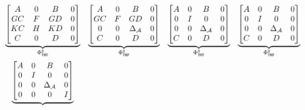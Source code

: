     \begin{equation}
        \label{eq:cont-skip} 
            \begin{matrix}
                \underbrace{\begin{bmatrix}
                    A  & 0 & B & 0 \\
                    GC & F & GD & 0 \\
                    KC & H & KD & 0 \\
                    C & 0 & D & 0 \\
                \end{bmatrix}}_{\clmat_{\cT\cH\cT}^{\Skip}} &
                \underbrace{\begin{bmatrix}
                    A & 0 & B & 0 \\
                    GC & F & GD & 0 \\
                    0 & 0 & \Delta_\actuator & 0 \\
                    C & 0 & D & 0
                \end{bmatrix}}_{\clmat_{\cT\cH\cF}^{\Skip}} &
                \underbrace{\begin{bmatrix}
                    A & 0 & B & 0 \\
                    0 & I & 0 & 0 \\
                    0 & 0 & \Delta_\actuator & 0 \\
                    C & 0 & D & 0
                \end{bmatrix}}_{\clmat_{\cT\cM\cT}^{\Skip}} &
                \underbrace{\begin{bmatrix}
                    A & 0 & B & 0 \\
                    0 & I & 0 & 0 \\
                    0 & 0 & \Delta_\actuator & 0 \\
                    C & 0 & D & 0
                \end{bmatrix}}_{\clmat_{\cT\cM\cF}^{\Skip}} \\[4em]
                \underbrace{\begin{bmatrix}
                    A & 0 & B & 0 \\
                    0 & I & 0 & 0 \\
                    0 & 0 & \Delta_\actuator & 0 \\
                    0 & 0 & 0 & I

\end{bmatrix}}
\end{matrix}
\end{equation}
